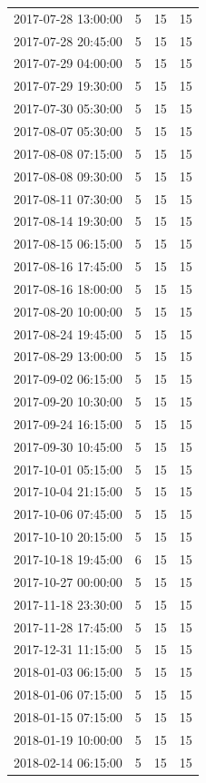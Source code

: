 \begin{tabular}{lrrr}
2017-07-28 13:00:00 & 5 & 15 & 15 \\
2017-07-28 20:45:00 & 5 & 15 & 15 \\
2017-07-29 04:00:00 & 5 & 15 & 15 \\
2017-07-29 19:30:00 & 5 & 15 & 15 \\
2017-07-30 05:30:00 & 5 & 15 & 15 \\
2017-08-07 05:30:00 & 5 & 15 & 15 \\
2017-08-08 07:15:00 & 5 & 15 & 15 \\
2017-08-08 09:30:00 & 5 & 15 & 15 \\
2017-08-11 07:30:00 & 5 & 15 & 15 \\
2017-08-14 19:30:00 & 5 & 15 & 15 \\
2017-08-15 06:15:00 & 5 & 15 & 15 \\
2017-08-16 17:45:00 & 5 & 15 & 15 \\
2017-08-16 18:00:00 & 5 & 15 & 15 \\
2017-08-20 10:00:00 & 5 & 15 & 15 \\
2017-08-24 19:45:00 & 5 & 15 & 15 \\
2017-08-29 13:00:00 & 5 & 15 & 15 \\
2017-09-02 06:15:00 & 5 & 15 & 15 \\
2017-09-20 10:30:00 & 5 & 15 & 15 \\
2017-09-24 16:15:00 & 5 & 15 & 15 \\
2017-09-30 10:45:00 & 5 & 15 & 15 \\
2017-10-01 05:15:00 & 5 & 15 & 15 \\
2017-10-04 21:15:00 & 5 & 15 & 15 \\
2017-10-06 07:45:00 & 5 & 15 & 15 \\
2017-10-10 20:15:00 & 5 & 15 & 15 \\
2017-10-18 19:45:00 & 6 & 15 & 15 \\
2017-10-27 00:00:00 & 5 & 15 & 15 \\
2017-11-18 23:30:00 & 5 & 15 & 15 \\
2017-11-28 17:45:00 & 5 & 15 & 15 \\
2017-12-31 11:15:00 & 5 & 15 & 15 \\
2018-01-03 06:15:00 & 5 & 15 & 15 \\
2018-01-06 07:15:00 & 5 & 15 & 15 \\
2018-01-15 07:15:00 & 5 & 15 & 15 \\
2018-01-19 10:00:00 & 5 & 15 & 15 \\
2018-02-14 06:15:00 & 5 & 15 & 15 \\

\end{tabular}
